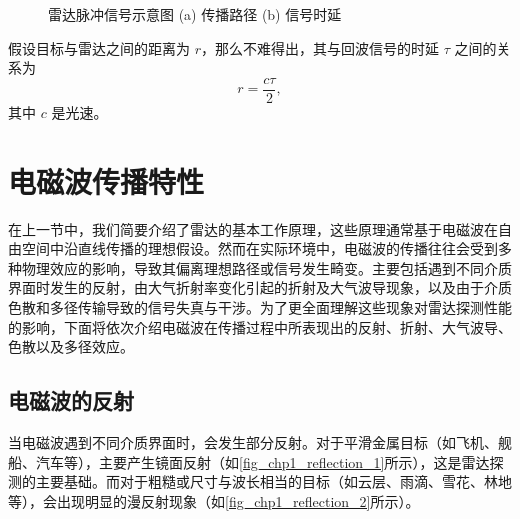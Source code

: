 \begin{figure}[htb!]
\begin{subfigure}{.8\textwidth}
        \caption{}
        \label{fig_chp1_radar_pulse_2}
    \end{subfigure}
    \caption{雷达脉冲信号示意图 (a) 传播路径 (b) 信号时延}
    \label{fig_chp1_radar_pulse}
\end{figure}

假设目标与雷达之间的距离为 $r$，那么不难得出，其与回波信号的时延 $\tau$ 之间的关系为
\begin{equation}
    r = \frac{c \tau}{2},
    \label{eq:radar_time_delay}
\end{equation}
其中 $c$ 是光速。

\section{电磁波传播特性}

在上一节中，我们简要介绍了雷达的基本工作原理，这些原理通常基于电磁波在自由空间中沿直线传播的理想假设。然而在实际环境中，电磁波的传播往往会受到多种物理效应的影响，导致其偏离理想路径或信号发生畸变。主要包括遇到不同介质界面时发生的反射，由大气折射率变化引起的折射及大气波导现象，以及由于介质色散和多径传输导致的信号失真与干涉。为了更全面理解这些现象对雷达探测性能的影响，下面将依次介绍电磁波在传播过程中所表现出的反射、折射、大气波导、色散以及多径效应。

\subsection{电磁波的反射}

当电磁波遇到不同介质界面时，会发生部分反射。对于平滑金属目标（如飞机、舰船、汽车等），主要产生镜面反射（如\cref{fig_chp1_reflection_1}所示），这是雷达探测的主要基础。而对于粗糙或尺寸与波长相当的目标（如云层、雨滴、雪花、林地等），会出现明显的漫反射现象（如\cref{fig_chp1_reflection_2}所示）。

